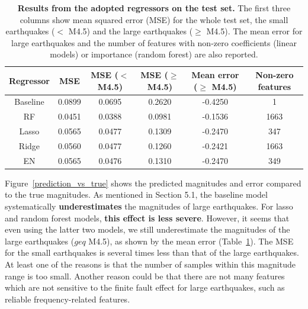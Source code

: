 \documentclass{article} %
\begin{document}
\begin{table}[htbp]
	\small
	\centering
	\begin{tabular}{@{}|c|c|c|c|c|c|@{}} %
		\hline
		\cline{2-4}
		Regressor & MSE & MSE ($<$ M4.5) & MSE ($\geq$ M4.5) & Mean error ($\geq$ M4.5) & Non-zero features\\ \hline \hline
		Baseline & 0.0899 & 0.0695 & 0.2620 & -0.4250  & 1 \\
		RF & 0.0451 & 0.0388 & 0.0981 & -0.1536 & 1663 \\ 
		Lasso &  0.0565 & 0.0477 & 0.1309 & -0.2470 & 347 \\ 
		Ridge & 0.0560 & 0.0477 & 0.1260 & -0.2421 & 1663 \\ 
		EN & 0.0565 & 0.0476 & 0.1310 & -0.2470 & 349 \\ \hline
	\end{tabular}
	\caption{{\bf Results from the adopted regressors on the test set.} The first three columns show mean squared error (MSE) for the whole test set, the small earthquakes ($<$ M4.5) and the large earthquakes ($\geq$ M4.5). The mean error for large earthquakes and the number of features with non-zero coefficients (linear models) or importance (random forest) are also reported.}
	\label{tab1}
\end{table}

Figure~\ref{prediction_vs_true} shows the predicted magnitudes and error compared to the true magnitudes. As mentioned in Section 5.1, the baseline model systematically \textbf{underestimates} the magnitudes of large earthquakes. For lasso and random forest models, \textbf{this effect is less severe}. However, it seems that even using the latter two models, we still underestimate the magnitudes of the large earthquakes ($geq$ M4.5), as shown by the mean error (Table~\ref{tab1}). The MSE for the small earthquakes is several times less than that of the large earthquakes. At least one of the reasons is that the number of samples within this magnitude range is too small. Another reason could be that there are not many features which are not sensitive to the finite fault effect for large earthquakes, such as reliable frequency-related features.
\end{document}
